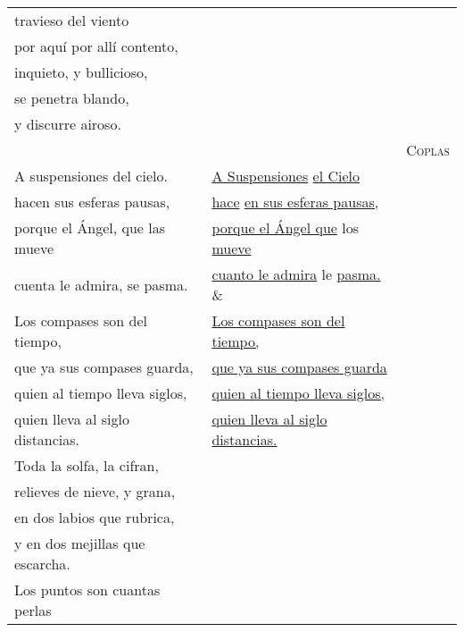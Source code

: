 \documentclass{aac-table}
\newcommand{\str}{\hspace{1em}}
\begin{document}
\begin{longtable}{lll}
    travieso del viento &
    & \\

    por aquí por allí contento, &
    & \\

    inquieto, y bullicioso, &
    & \\

    se penetra blando, &
    & \\

    y discurre airoso.
    & \\

    &
    &
    \textsc{Coplas} \\


    \str{} A suspensiones del cielo. &
    \str{} \uline{A Suspensiones} \uline{el Cielo} & 
    \\

    hacen sus esferas pausas, &
    \uline{hace} \uline{en sus esferas pausas,} &
    \\

    porque el Ángel, que las mueve &
    \uline{porque el Ángel que} los \uline{mueve} &
    \\

    cuenta le admira, se pasma. &
    \uline{cuanto le admira} le \uline{pasma.} \&
    \\

    \str{} Los compases son del tiempo, &
    \str{} \uline{Los compases son del tiempo,} &
    \\

    que ya sus compases guarda, &
    \uline{que ya sus compases guarda} &
    \\

    quien al tiempo lleva siglos, &
    \uline{quien al tiempo lleva siglos,} &
    \\

    quien lleva al siglo distancias. &
    \uline{quien lleva al siglo distancias.} &
    \\

    \str{} Toda la solfa, la cifran, &
    & \\

    relieves de nieve, y grana, &
    & \\

    en dos labios que rubrica, &
    & \\

    y en dos mejillas que escarcha. &
    & \\

    \str{} Los puntos son cuantas perlas &
    & \\


\end{longtable}
\end{document}
